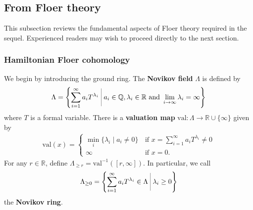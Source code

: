 \documentclass[12pt]{amsart}
\def\bigmid{\ \rule[-3.5mm]{0.1mm}{9mm}\ }
\newtheorem{theorem}{Theorem}[section]
\theoremstyle{definition}
\newcommand{\RR}{{\mathbb R}}
\newcommand{\QQ}{{\mathbb Q}}
\begin{document}
\vspace{0.3 cm}
\subsection{From Floer theory}\label{floer} This subsection reviews the fundamental aspects of Floer theory required in the sequel. Experienced readers may wish to proceed directly to the next section.

\subsubsection{Hamiltonian Floer cohomology}
We begin by introducing the ground ring. The \textbf{Novikov field} $\Lambda$ is defined by
\begin{align*}
    \Lambda = \left\{ \sum_{i=1}^\infty a_i T^{\lambda_i} \bigmid a_i \in \QQ, \lambda_i \in \RR\,\,\text{and}\,\, \lim_{i \to \infty} \lambda_i = \infty \right\} 
\end{align*}
where $T$ is a formal variable. There is a \textbf{valuation map} $\textrm{val} : \Lambda \to \RR \cup \{\infty\}$ given by
\begin{align*}
    \textrm{val} (x) = 
    \begin{cases}
      \displaystyle\min_{i} \{\lambda_i \mid a_i \neq 0 \} \,&\text{if}\,\, x = \displaystyle\sum_{i=1}^\infty a_i T^{\lambda_i} \neq 0\\
      \infty \,&\text{if}\,\, x = 0.
    \end{cases}   
\end{align*}
For any $r \in \RR$, define $\Lambda_{\geq r} = \textrm{val}^{-1}([r,\infty])$. In particular, we call
\begin{align*}
    \Lambda_{\geq 0} = \left\{ \sum_{i=1}^\infty a_i T^{\lambda_i} \in \Lambda \bigmid  \lambda_i \geq 0 \right\}
\end{align*}
the \textbf{Novikov ring}. 
\vspace{0.2 cm}
\end{document}
